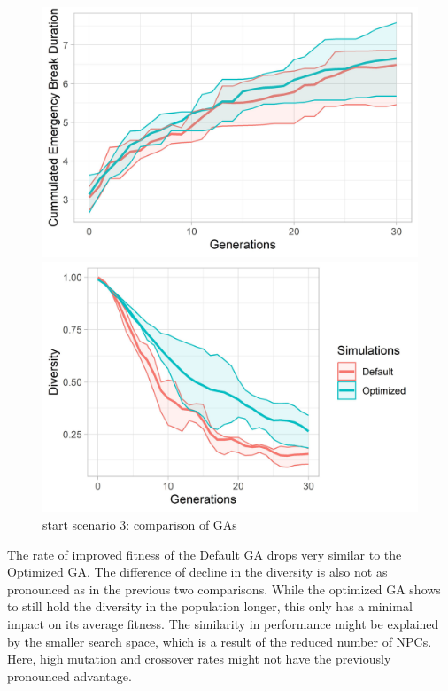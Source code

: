 \begin{figure}[ht] 
	\begin{minipage}[b]{0.5\linewidth}
		\centering
		\includegraphics[width=1\linewidth]{simulations/evaluation/plots/sim_3_ga_generations} 
	\end{minipage}%
	\begin{minipage}[b]{0.5\linewidth}
		\centering
		\includegraphics[width=1\linewidth]{simulations/evaluation/plots/sim_3_ga_diversity} 
	\end{minipage} 
	\caption{start scenario 3: comparison of GAs}
	\label{fig:evaluation:sim_3_ga_comparison}
\end{figure}


The rate of improved fitness of the Default GA drops very similar to the Optimized GA. The difference of decline in the diversity is also not as pronounced as in the previous two comparisons. While the optimized GA shows to still hold the diversity in the population longer, this only has a minimal impact on its average fitness. The similarity in performance might be explained by the smaller search space, which is a result of the reduced number of NPCs. Here, high mutation and crossover rates might not have the previously pronounced advantage.

